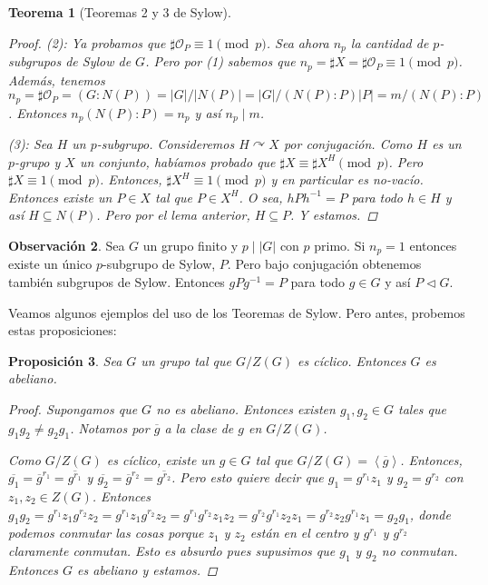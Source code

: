 \documentclass[12pt]{book}
\newtheorem{teo}{Teorema}[section]
\newtheorem{prop}[teo]{Proposición}
\theoremstyle{definition}
\newtheorem{obs}[teo]{Observación}
\def\acts{\curvearrowright}
\begin{document}
\begin{teo}[Teoremas 2 y 3 de Sylow]
\begin{proof}
(\textit{2}): Ya probamos que $\sharp \mathcal{O}_P\equiv 1\pmod{p}$. Sea ahora $n_p$ la cantidad de $p$-subgrupos de Sylow de $G$. Pero por (\textit{1}) sabemos que $n_p = \sharp X = \sharp \mathcal{O}_P \equiv 1\pmod{p}$. Además, tenemos $n_p = \sharp \mathcal{O}_P = (G:N(P)) = |G|/|N(P)| = |G|/(N(P):P)|P| = m/(N(P):P)$. Entonces $n_p (N(P):P) = n_p$ y así $n_p\mid m$.

(\textit{3}): Sea $H$ un $p$-subgrupo. Consideremos $H\acts X$ por conjugación. Como $H$ es un $p$-grupo y $X$ un conjunto, habíamos probado que $\sharp X \equiv \sharp X^H \pmod{p}$. Pero $\sharp X \equiv 1\pmod{p}$. Entonces, $\sharp X^H \equiv 1 \pmod{p}$ y en particular es no-vacío. Entonces existe un $P\in X$ tal que $P\in X^H$. O sea, $hPh^{-1} = P $ para todo $h\in H$ y así $H\subseteq N(P)$. Pero por el lema anterior, $H\subseteq P$. Y estamos.

\end{proof}
\end{teo}

\begin{obs}
Sea $G$ un grupo finito y $p\mid |G|$ con $p$ primo. Si $n_p=1$ entonces existe un único $p$-subgrupo de Sylow, $P$. Pero bajo conjugación obtenemos también subgrupos de Sylow. Entonces $gPg^{-1} = P$ para todo $g\in G$ y así $P\triangleleft G$.
\end{obs}

Veamos algunos ejemplos del uso de los Teoremas de Sylow. Pero antes, probemos estas proposiciones:

\begin{prop}
Sea $G$ un grupo tal que $G/Z(G)$ es cíclico. Entonces $G$ es abeliano.
\begin{proof}
Supongamos que $G$ no es abeliano. Entonces existen $g_1,g_2\in G$ tales que $g_1g_2 \neq g_2g_1$. Notamos por $\overline{g}$ a la clase de $g$ en $G/Z(G)$.

Como $G/Z(G)$ es cíclico, existe un $g\in G$ tal que $G/Z(G) = \left\langle \overline{g}\right\rangle$. Entonces, $\overline{g_1} = \overline{g}^{r_1} = \overline{g^{r_1}}$ y $\overline{g_2} = \overline{g}^{r_2} = \overline{g^{r_2}}$. Pero esto quiere decir que $g_1 = g^{r_1}z_1$ y $g_2 = g^{r_2}$ con $z_1,z_2\in Z(G)$. Entonces $g_1g_2 = g^{r_1}z_1 g^{r_2}z_2 = g^{r_1}z_1 g^{r_2}z_2 = g^{r_1}g^{r_2}z_1 z_2 = g^{r_2}g^{r_1}z_2z_1 = g^{r_2}z_2 g^{r_1}z_1 = g_2g_1$, donde podemos conmutar las cosas porque $z_1$ y $z_2$ están en el centro y $g^{r_1}$ y $g^{r_2}$ claramente conmutan. Esto es absurdo pues supusimos que $g_1$ y $g_2$ no conmutan. Entonces $G$ es abeliano y estamos.
\end{proof}
\end{prop}
\end{document}
